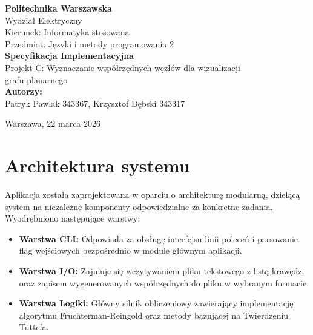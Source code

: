 \documentclass[12pt,a4paper]{article}
\begin{document}
 

\begin{titlepage} 
    \begin{center} 
        \vspace*{1cm} 
        
        {\LARGE \textbf{Politechnika Warszawska}} \\[0.2cm]  
        {\Large Wydział Elektryczny} \\[2cm]  
        
        {\large Kierunek: Informatyka stosowana} \\[0.1cm]  
        {\large Przedmiot: Języki i metody programowania 2} \\[3.5cm]  
        
        {\Huge \textbf{Specyfikacja Implementacyjna}} \\[1cm]  
        {\Large Projekt C: Wyznaczanie współrzędnych węzłów dla wizualizacji\\ grafu planarnego} \\[3.5cm]  
        
        {\large \textbf{Autorzy:}} \\[0.1cm]  
        {\large Patryk Pawlak 343367, Krzysztof Dębski 343317}  
        
        \vfill 
        
        {\large Warszawa, 22 marca 2026}  
        \vspace*{0.5cm} 
    \end{center} 
\end{titlepage} 

\newpage 

\tableofcontents 
\newpage 


\section{Architektura systemu}

Aplikacja została zaprojektowana w oparciu o architekturę modularną, dzielącą system na niezależne komponenty odpowiedzialne za konkretne zadania. Wyodrębniono następujące warstwy: 

\begin{itemize} 
    \item \textbf{Warstwa CLI:} Odpowiada za obsługę interfejsu linii poleceń i parsowanie flag wejściowych bezpośrednio w module głównym aplikacji. 
    \item \textbf{Warstwa I/O:} Zajmuje się wczytywaniem pliku tekstowego z listą krawędzi oraz zapisem wygenerowanych współrzędnych do pliku w wybranym formacie. 
    \item \textbf{Warstwa Logiki:} Główny silnik obliczeniowy zawierający implementację algorytmu Fruchterman-Reingold oraz metody bazującej na Twierdzeniu Tutte'a. 
\end{itemize} 
\end{document}
